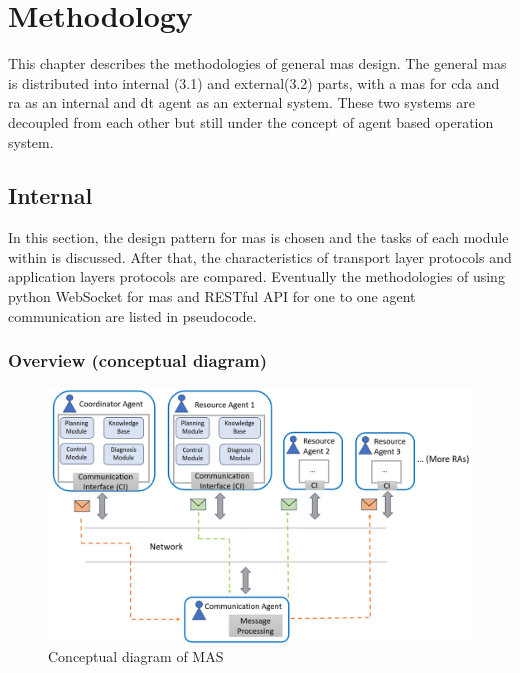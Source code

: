 \chapter{Methodology}%
This chapter describes the methodologies of general \gls{mas} design. 
The general \gls{mas} is distributed into internal (3.1) and external(3.2) parts,  
with a \gls{mas} for \gls{cda} and \gls{ra} as an internal and \gls{dt} agent as an external system. 
These two systems are decoupled from each other but still under the concept of agent based operation system. 
\section{Internal}
In this section, the design pattern for \gls{mas} is chosen and the tasks of each module within is discussed.
After that, the characteristics of transport layer protocols and application layers protocols are compared. 
Eventually the methodologies of using python WebSocket for \gls{mas} and RESTful API for one to one agent communication are listed in pseudocode. 

\subsection{Overview (conceptual diagram)}

\begin{figure}[htb]
\includegraphics[width=\textwidth]{figures/MAS_Conceptual_Diagram.png}
\centering
\caption{Conceptual diagram of MAS\label{fig: MASConceptual}}
\end{figure}


